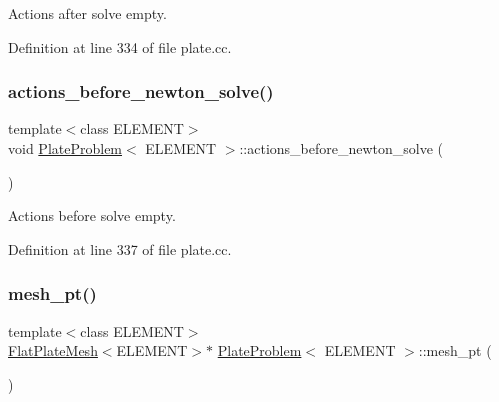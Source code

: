 Actions after solve empty. 



Definition at line 334 of file plate.\+cc.

\mbox{\label{classPlateProblem_a3be5bbf9e7473c75b8f752e0d77f5955}} 
\subsubsection{\texorpdfstring{actions\+\_\+before\+\_\+newton\+\_\+solve()}{actions\_before\_newton\_solve()}}
{\footnotesize\ttfamily template$<$class E\+L\+E\+M\+E\+NT$>$ \\
void \hyperlink{classPlateProblem}{Plate\+Problem}$<$ E\+L\+E\+M\+E\+NT $>$\+::actions\+\_\+before\+\_\+newton\+\_\+solve (\begin{DoxyParamCaption}{ }\end{DoxyParamCaption})\hspace{0.3cm}{\ttfamily [inline]}}



Actions before solve empty. 



Definition at line 337 of file plate.\+cc.

\mbox{\label{classPlateProblem_a964d7f9dec01b2d907fa7f3005418fcf}} 
\subsubsection{\texorpdfstring{mesh\+\_\+pt()}{mesh\_pt()}}
{\footnotesize\ttfamily template$<$class E\+L\+E\+M\+E\+NT$>$ \\
\hyperlink{classFlatPlateMesh}{Flat\+Plate\+Mesh}$<$E\+L\+E\+M\+E\+NT$>$$\ast$ \hyperlink{classPlateProblem}{Plate\+Problem}$<$ E\+L\+E\+M\+E\+NT $>$\+::mesh\+\_\+pt (\begin{DoxyParamCaption}{ }\end{DoxyParamCaption})\hspace{0.3cm}{\ttfamily [inline]}}




